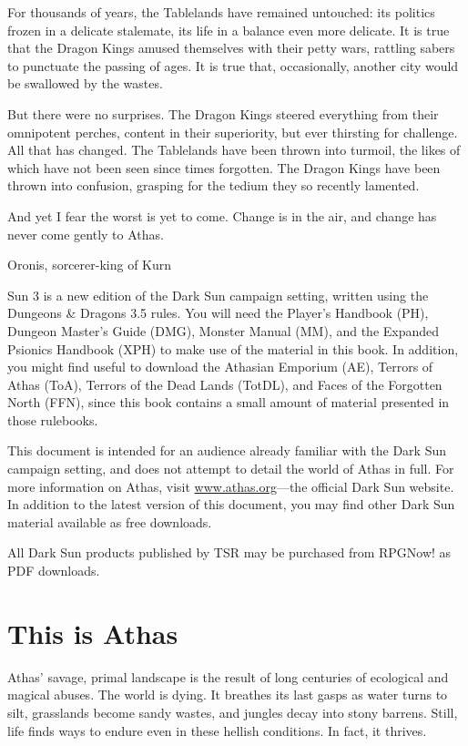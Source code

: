 {For thousands of years, the Tablelands have remained untouched: its politics frozen in a delicate stalemate, its life in a balance even more delicate. It is true that the Dragon Kings amused themselves with their petty wars, rattling sabers to punctuate the passing of ages. It is true that, occasionally, another city would be swallowed by the wastes.

But there were no surprises. The Dragon Kings steered everything from their omnipotent perches, content in their superiority, but ever thirsting for challenge. All that has changed. The Tablelands have been thrown into turmoil, the likes of which have not been seen since times forgotten. The Dragon Kings have been thrown into confusion, grasping for the tedium they so recently lamented.

And yet I fear the worst is yet to come. Change is in the air, and change has never come gently to Athas.}{Oronis, sorcerer-king of Kurn}

 Sun 3 is a new edition of the {\tableheader Dark Sun} campaign setting, written using the Dungeons \& Dragons 3.5 rules. You will need the Player's Handbook (PH), Dungeon Master's Guide (DMG), Monster Manual (MM), and the Expanded Psionics Handbook (XPH) to make use of the material in this book. In addition, you might find useful to download the Athasian Emporium (AE), Terrors of Athas (ToA), Terrors of the Dead Lands (TotDL), and Faces of the Forgotten North (FFN), since this book contains a small amount of material presented in those rulebooks.

This document is intended for an audience already familiar with the {\tableheader Dark Sun} campaign setting, and does not attempt to detail the world of Athas in full. For more information on Athas, visit \url{www.athas.org}---the official {\tableheader Dark Sun} website. In addition to the latest version of this document, you may find other {\tableheader Dark Sun} material available as free downloads.

All {\tableheader Dark Sun} products published by TSR may be purchased from RPGNow! as PDF downloads.

\section{This is Athas}

Athas' savage, primal landscape is the result of long centuries of ecological and magical abuses. The world is dying. It breathes its last gasps as water turns to silt, grasslands become sandy wastes, and jungles decay into stony barrens. Still, life finds ways to endure even in these hellish conditions. In fact, it thrives.

